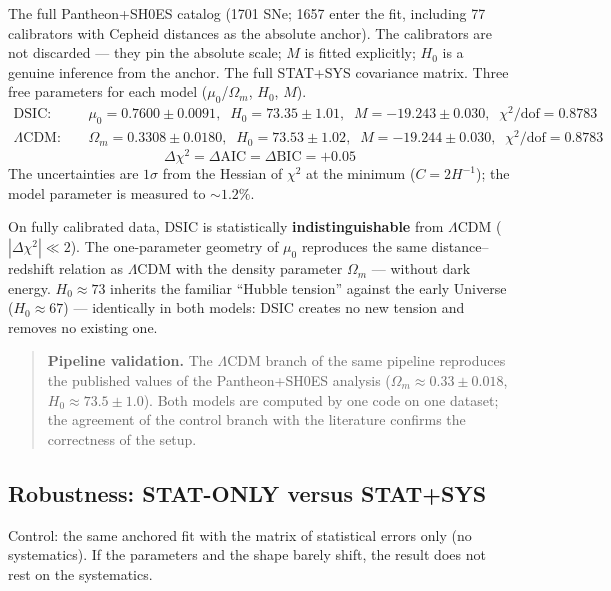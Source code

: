 \documentclass[a4paper,10pt]{article}
\begin{document}
The full Pantheon+SH0ES catalog (1701 SNe; 1657 enter the fit, including 77 calibrators with Cepheid distances as the absolute anchor). The calibrators are not discarded --- they pin the absolute scale; $M$ is fitted explicitly; $H_0$ is a genuine inference from the anchor. The full STAT+SYS covariance matrix. Three free parameters for each model ($\mu_0$/$\Omega_m$, $H_0$, $M$).
\begin{align*}
\text{DSIC}: &\quad \mu_0 = 0.7600 \pm 0.0091,\;\; H_0 = 73.35 \pm 1.01,\;\; M = -19.243 \pm 0.030,\;\; \chi^2/\text{dof} = 0.8783 \\
\Lambda\text{CDM}: &\quad \Omega_m = 0.3308 \pm 0.0180,\;\; H_0 = 73.53 \pm 1.02,\;\; M = -19.244 \pm 0.030,\;\; \chi^2/\text{dof} = 0.8783
\end{align*}
\begin{equation*}
\Delta\chi^2 = \Delta\text{AIC} = \Delta\text{BIC} = +0.05
\end{equation*}
The uncertainties are $1\sigma$ from the Hessian of $\chi^2$ at the minimum ($C = 2H^{-1}$); the model parameter is measured to ${\sim}1.2\%$.

On fully calibrated data, DSIC is statistically \textbf{indistinguishable} from $\Lambda$CDM ($|\Delta\chi^2| \ll 2$). The one-parameter geometry of $\mu_0$ reproduces the same distance--redshift relation as $\Lambda$CDM with the density parameter $\Omega_m$ --- without dark energy. $H_0 \approx 73$ inherits the familiar ``Hubble tension'' against the early Universe ($H_0 \approx 67$) --- identically in both models: DSIC creates no new tension and removes no existing one.

\begin{quote}
\textbf{Pipeline validation.} The $\Lambda$CDM branch of the same pipeline reproduces the published values of the Pantheon+SH0ES analysis ($\Omega_m \approx 0.33 \pm 0.018$, $H_0 \approx 73.5 \pm 1.0$). Both models are computed by one code on one dataset; the agreement of the control branch with the literature confirms the correctness of the setup.
\end{quote}

\subsection{Robustness: STAT-ONLY versus STAT+SYS}

Control: the same anchored fit with the matrix of statistical errors only (no systematics). If the parameters and the shape barely shift, the result does not rest on the systematics.
\end{document}
